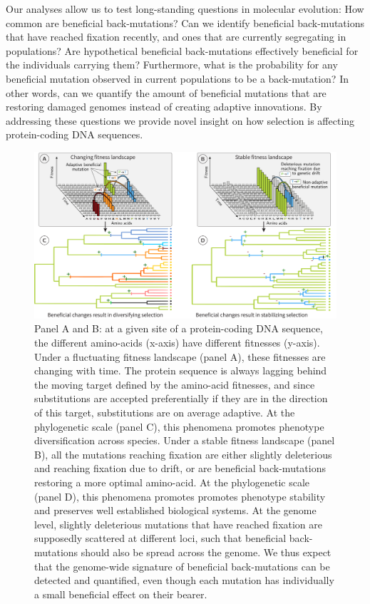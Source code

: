 Our analyses allow us to test long-standing questions in molecular evolution:
How common are beneficial back-mutations?
Can we identify beneficial back-mutations that have reached fixation recently, and ones that are currently segregating in populations?
Are hypothetical beneficial back-mutations effectively beneficial for the individuals carrying them?
Furthermore, what is the probability for any beneficial mutation observed in current populations to be a back-mutation?
In other words, can we quantify the amount of beneficial mutations that are restoring damaged genomes instead of creating adaptive innovations.
By addressing these questions we provide
novel insight on how selection is affecting protein-coding DNA sequences.

\begin{figure}[!ht]
    \centering
    \includegraphics[width=\textwidth, page=1] {artworks/figure.fitness-landscape}
    \caption{
        Panel A and B: at a given site of a protein-coding DNA sequence, the different amino-acids (x-axis) have different fitnesses (y-axis).
        Under a fluctuating fitness landscape (panel A), these fitnesses are changing with time.
        The protein sequence is always lagging behind the moving target defined by the amino-acid fitnesses, and since substitutions are accepted preferentially if they are in the direction of this target, substitutions are on average adaptive.
        At the phylogenetic scale (panel C), this phenomena promotes phenotype diversification across species.
        Under a stable fitness landscape (panel B), all the mutations reaching fixation are either slightly deleterious and reaching fixation due to drift, or are beneficial back-mutations restoring a more optimal amino-acid.
        At the phylogenetic scale (panel D), this phenomena promotes promotes phenotype stability and preserves well established biological systems.
        At the genome level, slightly deleterious mutations that have reached fixation are supposedly scattered at different loci, such that beneficial back-mutations should also be spread across the genome.
        We thus expect that the genome-wide signature of beneficial back-mutations can be detected and quantified, even though each mutation has individually a small beneficial effect on their bearer.
    }
    \label{fig:fitness-landscape}
\end{figure}